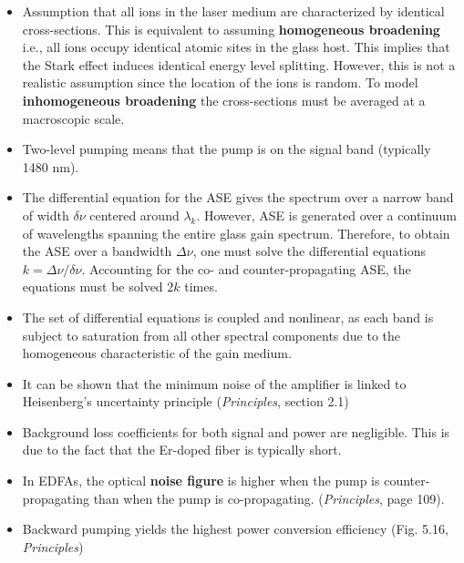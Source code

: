 \documentclass[a4paper]{article}
\begin{document}
\begin{itemize}
	\item Assumption that all ions in the laser medium are characterized by identical cross-sections. This is equivalent to assuming \textbf{homogeneous broadening} i.e., all ions occupy identical atomic sites in the glass host. This implies that the Stark effect induces identical energy level splitting. However, this is not a realistic assumption since the location of the ions is random. To model \textbf{inhomogeneous broadening} the cross-sections must be averaged at a macroscopic scale. 
	\item Two-level pumping means that the pump is on the signal band (typically 1480 nm).
	\item The differential equation for the ASE gives the spectrum over a narrow band of width $\delta\nu$ centered around $\lambda_k$. However, ASE is generated over a continuum of wavelengths spanning the entire glass gain spectrum. Therefore, to obtain the ASE over a bandwidth $\Delta\nu$, one must solve the differential equations $k = \Delta\nu/\delta\nu$. Accounting for the co- and counter-propagating ASE, the equations must be solved $2k$ times.
	\item The set of differential equations is coupled and nonlinear, as each band is subject to saturation from all other spectral components due to the homogeneous characteristic of the gain medium. 
	\item It can be shown that the minimum noise of the amplifier is linked to Heisenberg's uncertainty principle (\textit{Principles}, section 2.1) 
	\item Background loss coefficients for both signal and power are negligible. This is due to the fact that the Er-doped fiber is typically short.
	\item In EDFAs, the optical \textbf{noise figure} is higher when the pump is counter-propagating than when the pump is co-propagating. (\textit{Principles}, page 109).
	\item Backward pumping yields the highest power conversion efficiency (Fig. 5.16, \textit{Principles})
\end{itemize}




\end{document}
